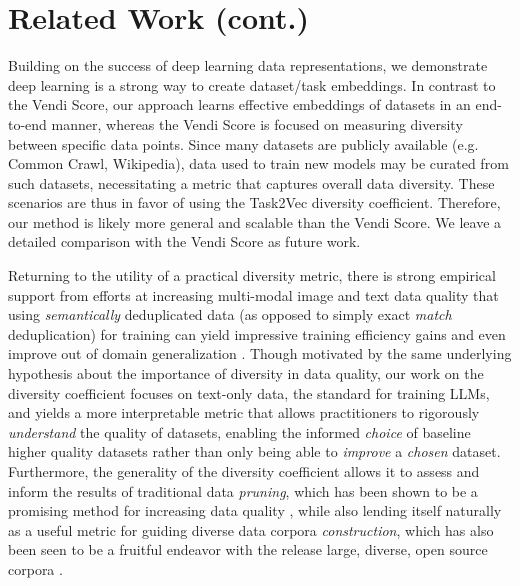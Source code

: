 \documentclass[10pt]{article} %
\begin{document}
\section{Related Work (cont.)}\label{related_work_cont}


Building on the success of deep learning data representations, we demonstrate deep learning is a strong way to create dataset/task embeddings.
In contrast to the Vendi Score, our approach learns effective embeddings of datasets in an end-to-end manner, whereas the Vendi Score is focused on measuring diversity between specific data points. 
Since many datasets are publicly available (e.g. Common Crawl, Wikipedia), data used to train new models may be curated from such datasets, necessitating a metric that captures overall data diversity.
These scenarios are thus in favor of using the Task2Vec diversity coefficient. 
Therefore, our method is likely more general and scalable than the Vendi Score. 
We leave a detailed comparison with the Vendi Score as future work.

Returning to the utility of a practical diversity metric, there is strong empirical support from efforts at increasing multi-modal image and text data quality that using \textit{semantically} deduplicated data (as opposed to simply exact \textit{match} deduplication) for training can yield impressive training efficiency gains and even improve out of domain generalization \citep{abbas2023semdedup, abbas2024effective}. Though motivated by the same underlying hypothesis about the importance of diversity in data quality, our work on the diversity coefficient focuses on text-only data, the standard for training LLMs, and yields a more interpretable metric that allows practitioners to rigorously \textit{understand} the quality of datasets, enabling the informed \textit{choice} of baseline higher quality datasets rather than only being able to \textit{improve} a \textit{chosen} dataset. Furthermore, the generality of the diversity coefficient allows it to assess and inform the results of traditional data \textit{pruning}, which has been shown to be a promising method for increasing data quality \citep{sorscher2023neural}, while also lending itself naturally as a useful metric for guiding diverse data corpora \textit{construction}, which has also been seen to be a fruitful endeavor with the release large, diverse, open source corpora \citep{thepile}.
\end{document}
